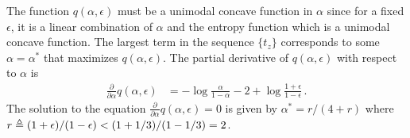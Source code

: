   The function $q(\alpha, \epsilon)$ must be a unimodal concave function in $\alpha$ since for a fixed $\epsilon$, 
  it is a linear combination of $\alpha$ and the entropy function which is a unimodal concave function. 
  The largest term in the sequence $\{t_z\}$ corresponds to some $\alpha=\alpha^*$ that maximizes $q(\alpha, \epsilon)$. 
  The partial derivative of $q(\alpha, \epsilon)$ with respect to $\alpha$ is
  \begin{align*}
  \frac{\partial}{\partial \alpha}q(\alpha, \epsilon) &= -\log \frac{\alpha}{1-\alpha} - 2 + \log \frac{1+\epsilon}{1-\epsilon} 
  \,.
  \end{align*}
  The solution to the equation $\frac{\partial}{\partial \alpha}q(\alpha, \epsilon) = 0$ is given by
  $\alpha^* = r/(4 + r)$ where $r \triangleq (1+\epsilon)/(1-\epsilon) < (1+1/3)/(1-1/3) = 2$.

